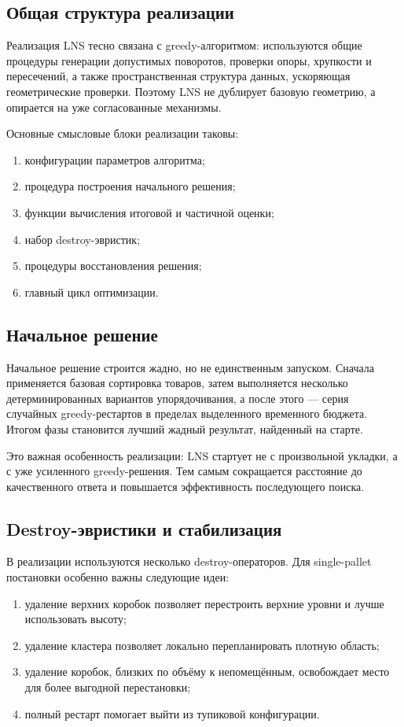 \documentclass[12pt,a4paper]{article}
\begin{document}
\subsection{Общая структура реализации}

Реализация LNS тесно связана с greedy-алгоритмом: используются общие процедуры генерации допустимых поворотов, проверки опоры, хрупкости и пересечений, а также пространственная структура данных, ускоряющая геометрические проверки. Поэтому LNS не дублирует базовую геометрию, а опирается на уже согласованные механизмы.

Основные смысловые блоки реализации таковы:
\begin{enumerate}
  \item конфигурации параметров алгоритма;
  \item процедура построения начального решения;
  \item функции вычисления итоговой и частичной оценки;
  \item набор destroy-эвристик;
  \item процедуры восстановления решения;
  \item главный цикл оптимизации.
\end{enumerate}

\subsection{Начальное решение}

Начальное решение строится жадно, но не единственным запуском. Сначала применяется базовая сортировка товаров, затем выполняется несколько детерминированных вариантов упорядочивания, а после этого --- серия случайных greedy-рестартов в пределах выделенного временного бюджета. Итогом фазы становится лучший жадный результат, найденный на старте.

Это важная особенность реализации: LNS стартует не с произвольной укладки, а с уже усиленного greedy-решения. Тем самым сокращается расстояние до качественного ответа и повышается эффективность последующего поиска.

\subsection{Destroy-эвристики и стабилизация}

В реализации используются несколько destroy-операторов. Для single-pallet постановки особенно важны следующие идеи:
\begin{enumerate}
  \item удаление верхних коробок позволяет перестроить верхние уровни и лучше использовать высоту;
  \item удаление кластера позволяет локально перепланировать плотную область;
  \item удаление коробок, близких по объёму к непомещённым, освобождает место для более выгодной перестановки;
  \item полный рестарт помогает выйти из тупиковой конфигурации.
\end{enumerate}
\end{document}
